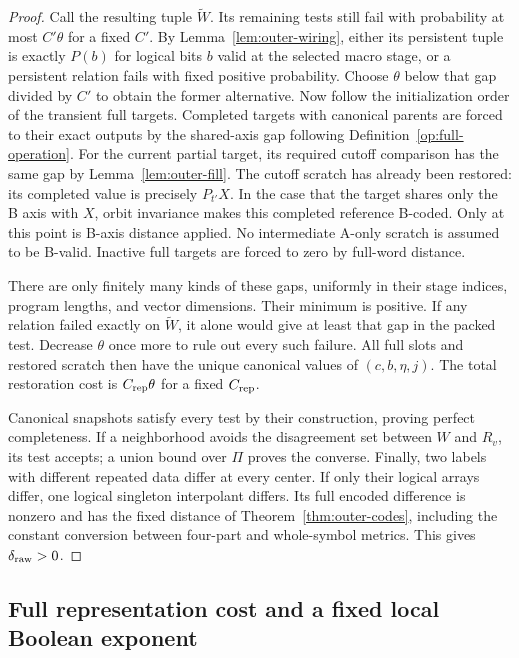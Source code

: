 \begin{proof}
Call the resulting tuple $\widetilde W$. Its remaining tests still fail
with probability at most $C'\theta$ for a fixed $C'$. By
Lemma~\ref{lem:outer-wiring}, either its persistent tuple is exactly
$P(b)$ for logical bits $b$ valid at the selected macro stage, or a
persistent relation fails with fixed positive probability. Choose
$\theta$ below that gap divided by $C'$ to obtain the former alternative.
Now follow the initialization order of the transient full targets.
Completed targets with canonical parents are forced to their exact
outputs by the shared-axis gap following Definition~\ref{op:full-operation}.
For the current partial target, its required cutoff comparison has the
same gap by Lemma~\ref{lem:outer-fill}. The cutoff scratch has already
been restored: its completed value is precisely $P_{t'}X$. In the case
that the target shares only the B axis with $X$, orbit invariance makes
this completed reference B-coded. Only at this point is B-axis distance
applied. No intermediate A-only scratch is assumed to be B-valid.
Inactive full targets are forced to zero by full-word distance.

There are only finitely many kinds of these gaps, uniformly in their
stage indices, program lengths, and vector dimensions. Their minimum is
positive. If any relation failed exactly on $\widetilde W$, it alone
would give at least that gap in the packed test. Decrease $\theta$ once
more to rule out every such failure. All full slots and restored scratch
then have the unique canonical values of $(c,b,\eta,j)$. The total
restoration cost is $C_{\rm rep}\theta$ for a fixed $C_{\rm rep}$.

Canonical snapshots satisfy every test by their construction, proving
perfect completeness. If a neighborhood avoids the disagreement set
between $W$ and $R_v$, its test accepts; a union bound over $\Pi$ proves
the converse. Finally, two labels with different repeated data differ
at every center. If only their logical arrays differ, one logical
singleton interpolant differs. Its full encoded difference is nonzero
and has the fixed distance of Theorem~\ref{thm:outer-codes}, including the
constant conversion between four-part and whole-symbol metrics. This
gives $\delta_{\rm raw}>0$.
\end{proof}

\subsection{Full representation cost and a fixed local Boolean exponent}

